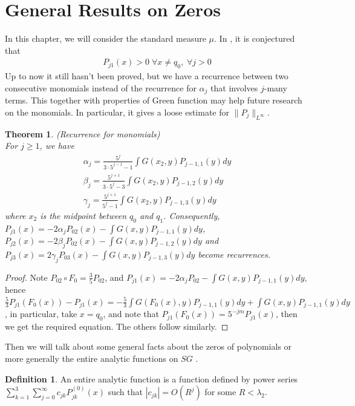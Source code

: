 \documentclass[12pt]{amsart}
\theoremstyle{plain}
\newtheorem{theorem}{Theorem}[section]
\theoremstyle{definition}
\newtheorem{definition}{Definition}[section]
\begin{document}
\section{General Results on 
Zeros}
In this chapter, we will consider the standard measure $\mu$. In \cite{NSTY}, it is conjectured that
\begin{gather}P_{j1}(x)>0 \;\forall x\neq q_0,\;\forall j>0 \label{conjecture}
\end{gather}
Up to now it still hasn't been proved, but we have a recurrence between two consecutive monomials instead of the recurrence for $\alpha_j$ that involves $j$-many terms. This together with properties of Green function may help future research on the monomials. In particular, it gives a loose estimate for $\|P_j\|_{L^\infty}$.
\begin{theorem}{(Recurrence for monomials)}\label{th:monomial recurrence}
\\For $j\ge 1$, we have 
\begin{gather}
\alpha_j=\frac{5^j}{3\cdot 5^{j-1}-1}\int G(x_2,y)P_{j-1,1}(y)dy\\
\beta_j=\frac{5^{j+1}}{3\cdot 5^j-3}\int G(x_2,y)P_{j-1,2}(y)dy\\
\gamma_j=\frac{5^{j+1}}{5^j-1}\int G(x_2,y)P_{j-1,3}(y)dy
\end{gather}
where $x_2$ is the midpoint between $q_0$ and $q_1$.
Consequently, $P_{j1}(x)=-2\alpha_jP_{02}(x)-\int G(x,y)P_{j-1,1}(y)dy$, $P_{j2}(x)=-2\beta_jP_{02}(x)-\int G(x,y)P_{j-1,2}(y)dy$ and $P_{j3}(x)=2\gamma_jP_{03}(x)-\int G(x,y)P_{j-1,3}(y)dy$ become recurrences.
\end{theorem}
\begin{proof}
Note $P_{02}\circ F_0=\frac 35 P_{02}$, and $P_{j1}(x)=-2\alpha_jP_{02}-\int G(x,y)P_{j-1,1}(y)dy$, hence $\frac 53P_{j1}(F_0(x))-P_{j1}(x)=-\frac53\int G(F_0(x),y)P_{j-1,1}(y)dy+\int G(x,y)P_{j-1,1}(y)dy$, in particular, take $x=q_0$, and note that $P_{j1}(F_0(x))=5^{-jm}P_{j1}(x)$, then we get the required equation. The others follow similarly.
\end{proof}
Then we will talk about some general facts about the zeros of polynomials or more generally the entire analytic functions on $SG$ \cite{NSTY}.\\
\begin{definition}\label{def:analytic} An entire analytic function is a function defined by power series $\sum\limits^3_{k=1}\sum\limits^\infty_{j=0}c_{jk}P_{jk}^{(0)}(x)$ such that $|c_{jk}|=O(R^j)$ for some $R<\lambda_2$.
\end{definition}
\end{document}
